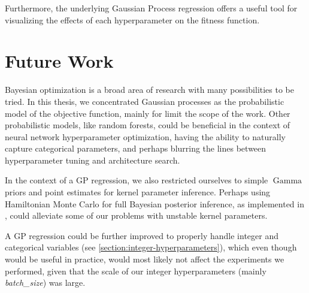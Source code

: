 Furthermore, the underlying Gaussian Process regression offers a useful tool for visualizing the effects of each hyperparameter on the fitness function.




\section{Future Work}

Bayesian optimization is a broad area of research with many possibilities to be tried. In this thesis, we concentrated Gaussian processes as the probabilistic model of the objective function, mainly for limit the scope of the work. Other probabilistic models, like random forests, could be beneficial in the context of neural network hyperparameter optimization, having the ability to naturally capture categorical parameters, and perhaps blurring the lines between hyperparameter tuning and architecture search.

In the context of a GP regression, we also restricted ourselves to simple $\operatorname{Gamma}$ priors and point estimates for kernel parameter inference. Perhaps using Hamiltonian Monte Carlo for full Bayesian posterior inference, as implemented in \cite{gpy2014}, could alleviate some of our problems with unstable kernel parameters.

A GP regression could be further improved to properly handle integer and categorical variables (see \autoref{section:integer-hyperparameters}), which even though would be useful in practice, would most likely not affect the experiments we performed, given that the scale of our integer hyperparameters (mainly \emph{batch\_size}) was large.


